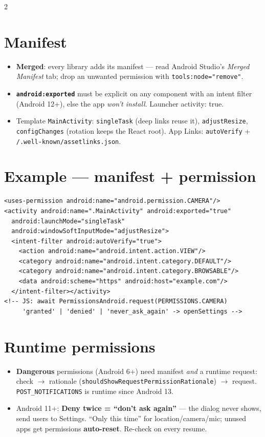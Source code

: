 \documentclass[8pt]{extarticle}
\begin{document}
\begin{multicols}{2}
\section{Manifest}
\begin{itemize}\raggedright
  \item \textbf{Merged}: every library adds its manifest — read Android Studio's
        \emph{Merged Manifest} tab; drop an unwanted permission with
        \texttt{tools:node="remove"}.
  \item \textbf{\texttt{android:exported}} must be explicit on any component with an intent
        filter (Android 12+), else the app \emph{won't install}. Launcher activity: true.
  \item Template \texttt{MainActivity}: \texttt{singleTask} (deep links reuse it),
        \texttt{adjustResize}, \texttt{configChanges} (rotation keeps the React root).
        App Links: \texttt{autoVerify} + \texttt{/.well-known/assetlinks.json}.
\end{itemize}

\section{Example — manifest + permission}
\begin{lstlisting}[language=XmlSheet]
<uses-permission android:name="android.permission.CAMERA"/>
<activity android:name=".MainActivity" android:exported="true"
  android:launchMode="singleTask"
  android:windowSoftInputMode="adjustResize">
  <intent-filter android:autoVerify="true">
    <action android:name="android.intent.action.VIEW"/>
    <category android:name="android.intent.category.DEFAULT"/>
    <category android:name="android.intent.category.BROWSABLE"/>
    <data android:scheme="https" android:host="example.com"/>
  </intent-filter></activity>
<!-- JS: await PermissionsAndroid.request(PERMISSIONS.CAMERA)
     'granted' | 'denied' | 'never_ask_again' -> openSettings -->
\end{lstlisting}

\section{Runtime permissions}
\begin{itemize}\raggedright
  \item \textbf{Dangerous} permissions (Android 6+) need manifest \emph{and} a runtime
        request: check $\to$ rationale (\texttt{shouldShowRequestPermissionRationale}) $\to$
        request. \texttt{POST\_NOTIFICATIONS} is runtime since Android 13.
  \item Android 11+: \textbf{Deny twice = ``don't ask again''} — the dialog never shows,
        send users to Settings. ``Only this time'' for location/camera/mic; unused apps get
        permissions \textbf{auto-reset}. Re-check on every resume.
\end{itemize}


\end{multicols}
\end{document}
